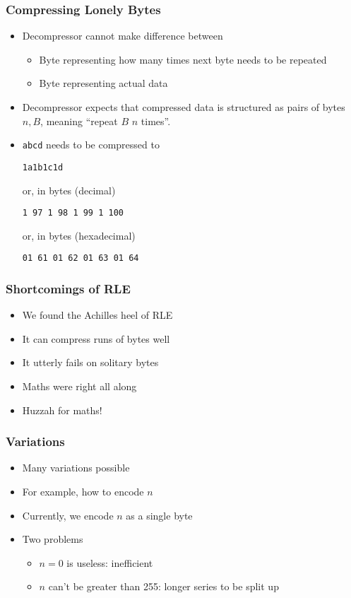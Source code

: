 \begin{frame}
  \frametitle{Compressing Lonely Bytes}
  \begin{itemize}
    \item Decompressor cannot make difference between
          \begin{itemize}
            \item Byte representing how many times next byte needs to be repeated
            \item Byte representing actual data
          \end{itemize}
    \item Decompressor expects that compressed data
          is structured as pairs of bytes $n,B$, meaning
          ``repeat $B$ $n$ times''.
    \item \texttt{abcd} needs to be compressed to
          \begin{center}
            \tt 1a1b1c1d
          \end{center}
          or, in bytes (decimal)
          \begin{center}
            \tt 1 97 1 98 1 99 1 100 
          \end{center}
          or, in bytes (hexadecimal)
          \begin{center}
            \tt 01 61 01 62 01 63 01 64 
          \end{center}
  \end{itemize}
\end{frame}

\begin{frame}
  \frametitle{Shortcomings of RLE}
  \begin{itemize}
    \item We found the Achilles heel of RLE
    \item It can compress runs of bytes well
    \item It utterly fails on solitary bytes
    \item Maths were right all along
    \item Huzzah for maths!
  \end{itemize}
\end{frame}

\begin{frame}
  \frametitle{Variations}
  \begin{itemize}
    \item Many variations possible
    \item For example, how to encode $n$
    \item Currently, we encode $n$ as a single byte
    \item Two problems
          \begin{itemize}
            \item $n = 0$ is useless: inefficient
            \item $n$ can't be greater than 255: longer series to be split up
          \end{itemize}
  \end{itemize}
\end{frame}

